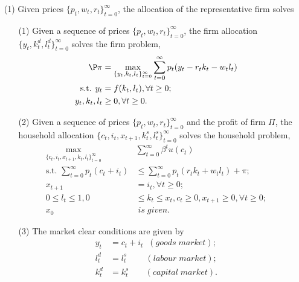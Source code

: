 \documentclass[12pt,notitlepage]{article}%
\numberwithin{equation}{section}
\begin{document}
 \begin{itemize}
 	\item[(1)] Given prices $\{p_t, w_t, r_t\}_{t=0}^{\infty}$, the allocation of the representative firm solves
 
 \begin{itemize}
 	\item[(1)] Given a sequence of prices $\{p_t,w_t,r_t\}_{t=0}^{\infty}$, the firm allocation $\{y_t,k_t^d,l_t^d\}_{t=0}^{\infty}$ solves the firm problem,
 	\begin{equation}
 	\begin{split}
 	\P\pi &= \max_{\{y_t,k_t,l_t\}_{t=0}^{\infty}}\sum_{t=0}^{\infty}
 	p_t(y_t-r_tk_t-w_tl_t)\\
 	\text{s.t.  }y_t&=f(k_t,l_t), \forall t\geq 0;\\
 	y_t,k_t,l_t&\geq 0, \forall t \geq 0.
 	\end{split}
 	\end{equation}
 	
 	\item[(2)] Given a sequence of prices $\{p_t,w_t,r_t\}_{t=0}^{\infty}$ and the profit of firm $\Pi$, the household allocation $\{c_t,i_t,x_{t+1},k_t^s,l_t^s\}_{t=0}^{\infty}$ solves the household problem,
 	\begin{equation}
 	\begin{split}
 	\max_{\{c_t,i_t,x_{t+1},k_t,l_t\}_{t=0}^{\infty}}&\sum_{t=0}^{\infty}
 	\beta ^tu(c_t)\\
 	\text{s.t.  } \sum_{t=0}^{\infty}p_t(c_t+i_t)
 	&\leq\sum_{t=0}^{\infty}p_t(r_tk_t+w_tl_t)+\pi;\\
 	x_{t+1}&=i_t, \forall t\geq 0;\\
 	0\leq l_t\leq 1,0&\leq k_t\leq x_t, c_t\geq 0, x_{t+1}\geq 0,\forall t \geq 0;\\
 	x_0 &\; is \; given.
 	\end{split}
 	\end{equation}
 	
 	\item[(3)] The market clear conditions are given by
 	\begin{equation*}
 	\begin{split}
 	y_t&=c_t+i_t \;\; (goods \;market);\\
 	l_t^d&=l_t^s \;\;\;\;\; \;\;\;(labour\; market);\\
 	k_t^d&=k_t^s  \;\;\;\;\; \;\;(capital \;market).
 	\end{split}
 	\end{equation*}
 \end{itemize}
 

 
 	
 \end{itemize}
	
\end{document}
